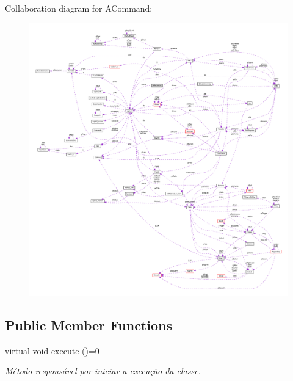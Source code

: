 Collaboration diagram for A\-Command\-:\nopagebreak
\begin{figure}[H]
\begin{center}
\leavevmode
\includegraphics[width=350pt]{class_a_command__coll__graph}
\end{center}
\end{figure}
\subsection*{Public Member Functions}
\begin{DoxyCompactItemize}
\item 
\hypertarget{class_a_command_a94c6a1d25eb0427389e15450019ebad8}{virtual void \hyperlink{class_a_command_a94c6a1d25eb0427389e15450019ebad8}{execute} ()=0}\label{class_a_command_a94c6a1d25eb0427389e15450019ebad8}

\begin{DoxyCompactList}\small\item\em Método responsável por iniciar a execução da classe. \end{DoxyCompactList}\end{DoxyCompactItemize}
